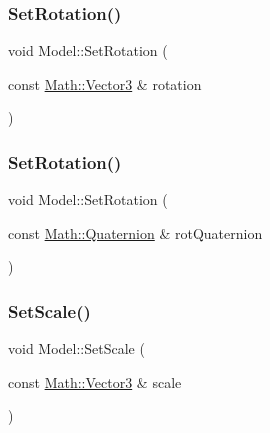 \subsubsection{\texorpdfstring{Set\+Rotation()}{SetRotation()}\hspace{0.1cm}{\footnotesize\ttfamily [1/2]}}
{\footnotesize\ttfamily void Model\+::\+Set\+Rotation (\begin{DoxyParamCaption}\item[{const \mbox{\hyperlink{struct_math_1_1_vector3}{Math\+::\+Vector3}} \&}]{rotation }\end{DoxyParamCaption})}

\mbox{\label{class_model_a512b73ff13cabdf1264d52a7a65b4481}} 
\subsubsection{\texorpdfstring{Set\+Rotation()}{SetRotation()}\hspace{0.1cm}{\footnotesize\ttfamily [2/2]}}
{\footnotesize\ttfamily void Model\+::\+Set\+Rotation (\begin{DoxyParamCaption}\item[{const \mbox{\hyperlink{struct_math_1_1_quaternion}{Math\+::\+Quaternion}} \&}]{rot\+Quaternion }\end{DoxyParamCaption})}

\mbox{\label{class_model_aeffe10c8cb6db69220bb5f1b588935e4}} 
\subsubsection{\texorpdfstring{Set\+Scale()}{SetScale()}\hspace{0.1cm}{\footnotesize\ttfamily [1/2]}}
{\footnotesize\ttfamily void Model\+::\+Set\+Scale (\begin{DoxyParamCaption}\item[{const \mbox{\hyperlink{struct_math_1_1_vector3}{Math\+::\+Vector3}} \&}]{scale }\end{DoxyParamCaption})}

\mbox{\label{class_model_a4c06da42f281939cfa54f9a955bc1321}} 
